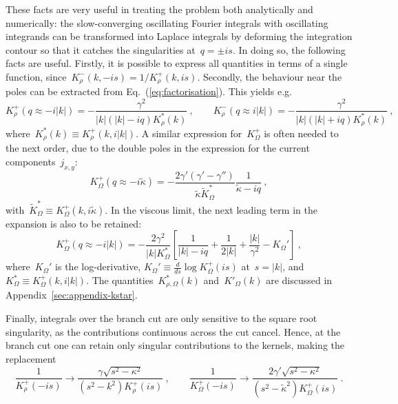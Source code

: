 \documentclass[preprint,aps,eqsecnum, prb]{revtex4-1}
\newcommand{\fplus}[1]{{#1}^{+}}
\newcommand{\fminus}[1]{{#1}^{-}}
\begin{document}
These facts are very useful in treating the problem both analytically and
numerically: the slow-converging oscillating Fourier integrals with
oscillating integrands can be transformed into Laplace
integrals by deforming the integration contour so that
it catches the singularities at~$q = \pm is$.
In doing so, the following facts are useful. Firstly,
it is possible to express all quantities in terms of a single function,
 since~$\fminus{K}_\rho(k, -is) = 1/\fplus{K}_\rho(k, is)$.  Secondly,
the behaviour near the poles can be extracted from
Eq.~(\ref{eq:factorisation}). This yields e.g. \begin{equation}
  \fplus{K}_\rho (q \approx -i |k|)
  = - \frac{\gamma^2}{|k|(|k| - i q) K_\rho^\ast(k)}
  \ ,
  \qquad
  \fminus{K}_{\rho}(q \approx i |k|) = - \frac{\gamma^2}{|k|(|k| + iq)
    K_\rho^\ast(k)}
  \ ,
\end{equation}
 where~$K_\rho^\ast(k) \equiv \fplus{K}_\rho(k, i|k|)$. A similar expression
 for~$\fplus{K}_\Omega$ is often needed to the next order, due to the double poles in the expression for the current components~$j_{x, y}$:
 \begin{equation}
 \fplus{K}_\Omega(q \approx -i {\tilde \kappa})
 = - \frac{2 \gamma' (\gamma' - \gamma'') }{{\tilde \kappa}
     {\tilde K}_\Omega^\ast}
      \frac{1}{{\tilde \kappa} - i q}
 \ ,
\end{equation}
with~${\tilde K}_\Omega^\ast \equiv \fplus{K}_\Omega(k, i{\tilde \kappa})$.
In the viscous limit, the next leading term in the expansion
is also to be retained:
 \begin{equation}
 \fplus{K}_\Omega(q \approx -i |k|)
 = - \frac{2 \gamma^2 }{|k| K_\Omega^\ast}
      \left[
      \frac{1}{|k| - i q}
       + \frac{1}{2|k|} + \frac{|k|}{\gamma^2} - K_\Omega'\right]
 \ ,
\end{equation}
where~$K_\Omega'$ is the log-derivative,
$K_\Omega' \equiv \frac{d}{ds} \log \fplus{K}_\Omega(is)$ at~$s = |k|$,
and~$K_\Omega^\ast \equiv \fplus{K}_\Omega(k, i|k|)$.
The quantities~$K_{\rho,\Omega}^\ast(k)$ and~$K'_\Omega(k)$ are discussed
in Appendix~\ref{sec:appendix-kstar}.

Finally, integrals over the branch cut are only sensitive
to the square root singularity, as the contributions continuous
across the cut cancel.
Hence, at the branch cut one can retain only singular contributions
to the kernels, making the replacement
\begin{equation}
  \frac{1}{\fplus{K}_\rho (-is)} \to
   \frac{\gamma\sqrt{s^2 - \kappa^2}}{(s^2 - k^2) \fplus{K}_\rho(is)}
  \ , \qquad
  \frac{1}{\fplus{K}_\Omega(-is)} \to
  \frac{2 \gamma' \sqrt{s^2 - \kappa^2}}{(s^2 - {\tilde \kappa}^2)
  \fplus{K}_\Omega(is)}
  \ .
\end{equation}
\end{document}

